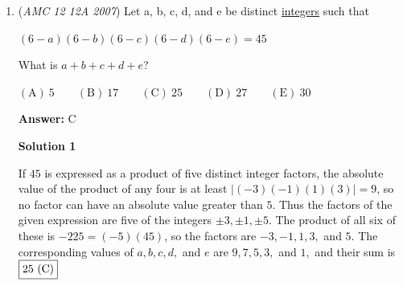 \begin{enumerate}
 



\textbf{Solution 2}

If the mouse is at $(x, y) = (x, 18 - 5x)$, then the square of the distance from the mouse to the cheese is $(x - 12)^2 + (8 - 5x)^2 = 26(x^2 - 4x + 8) = 26((x - 2)^2 + 4).$The value of this expression is smallest when $x = 2$, so the mouse is closest to the cheese at the point $(2, 8)$, and $a+b=2+8 = \boxed{10}$.

 



\textbf{Solution 3}

We are trying to find the point where distance between the mouse and $(12, 10)$ is minimized. This point is where the line that passes through $(12, 10)$ and is perpendicular to $y=-5x+18$ intersects $y=-5x+18$. By basic knowledge of perpendicular lines, this line is $y=\frac{x}{5}+\frac{38}{5}$. This line intersects $y=-5x+18$ at $(2,8)$. So $a+b=\boxed{10}$. - MegaLucario1001

 


 



\textbf{Solution 4}

If the mouse is at $(x, y) = (x, 18 - 5x)$, then the square of the distance from the mouse to the cheese is$(x - 12)^2 + (8 - 5x)^2 = 26(x^2 - 4x + 8) = 26((x - 2)^2 + 4)$.The value of this expression is smallest when $x = 2$, so the mouse is closest to the cheese at the point $(2, 8)$, and $a+b=2+8 = \boxed{10}$.-Paixiao

 


	\item (\textit{AMC 12 12A 2007}) Let a, b, c, d, and e be distinct \href{https://artofproblemsolving.com/wiki/index.php?title=Integer}{integers} such that


 $(6-a)(6-b)(6-c)(6-d)(6-e)=45$

 What is $a+b+c+d+e$?


 $\mathrm{(A)}\ 5\qquad \mathrm{(B)}\ 17\qquad \mathrm{(C)}\ 25\qquad \mathrm{(D)}\ 27\qquad \mathrm{(E)}\ 30$

 \textbf{Answer: }C



\textbf{Solution 1}

If $45$ is expressed as a product of five distinct integer factors, the absolute value of the product of any four is at least $|(-3)(-1)(1)(3)|=9$, so no factor can have an absolute value greater than $5$. Thus the factors of the given expression are five of the integers $\pm 3, \pm 1, \pm 5$. The product of all six of these is $-225=(-5)(45)$, so the factors are $-3, -1, 1, 3,$ and $5.$ The corresponding values of $a, b, c, d,$ and $e$ are $9, 7, 5, 3,$ and $1,$ and their sum is $\fbox{25 (C)}$





\end{enumerate}
